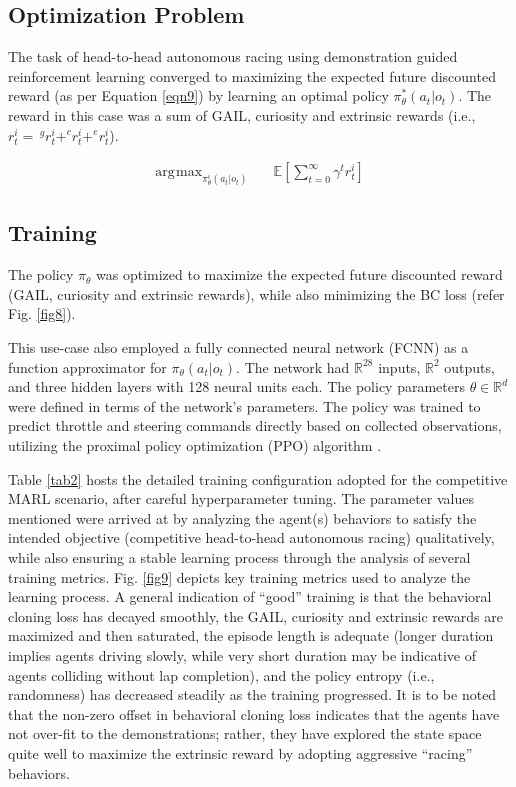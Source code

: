 \documentclass[letterpaper, 10 pt, conference]{ieeeconf}  %
\DeclareMathOperator*{\argmax}{\arg\!\max} %
\begin{document}
\subsection{Optimization Problem}
\label{Sub-Section: Optimization Problem II}

The task of head-to-head autonomous racing using demonstration guided reinforcement learning converged to maximizing the expected future discounted reward (as per Equation \ref{eqn9}) by learning an optimal policy $\pi^*_\theta \left(a_t|o_t\right)$. The reward in this case was a sum of GAIL, curiosity and extrinsic rewards (i.e., $r^i_t =\, ^{g}r^i_t + ^{c}r^i_t + ^{e}r^i_t$).

\begin{align}
\label{eqn9}
\argmax_{\pi^i_\theta \left(a_t|o_t\right)} \quad &\mathbb{E}\left [ \sum_{t=0}^{\infty} \gamma^t r^i_t \right ]
\end{align}

\subsection{Training}
\label{Sub-Section: Training II}

The policy $\pi_\theta$ was optimized to maximize the expected future discounted reward (GAIL, curiosity and extrinsic rewards), while also minimizing the BC loss (refer Fig. \ref{fig8}).

This use-case also employed a fully connected neural network (FCNN) as a function approximator for $\pi_\theta \left ( a_t | o_t \right )$. The network had $\mathbb{R}^{28}$ inputs, $\mathbb{R}^{2}$ outputs, and three hidden layers with 128 neural units each. The policy parameters $\theta \in \mathbb{R}^d$ were defined in terms of the network's parameters. The policy was trained to predict throttle and steering commands directly based on collected observations, utilizing the proximal policy optimization (PPO) algorithm \cite{PPO2017}.

Table \ref{tab2} hosts the detailed training configuration adopted for the competitive MARL scenario, after careful hyperparameter tuning. The parameter values mentioned were arrived at by analyzing the agent(s) behaviors to satisfy the intended objective (competitive head-to-head autonomous racing) qualitatively, while also ensuring a stable learning process through the analysis of several training metrics. Fig. \ref{fig9} depicts key training metrics used to analyze the learning process. A general indication of ``good'' training is that the behavioral cloning loss has decayed smoothly, the GAIL, curiosity and extrinsic rewards are maximized and then saturated, the episode length is adequate (longer duration implies agents driving slowly, while very short duration may be indicative of agents colliding without lap completion), and the policy entropy (i.e., randomness) has decreased steadily as the training progressed. It is to be noted that the non-zero offset in behavioral cloning loss indicates that the agents have not over-fit to the demonstrations; rather, they have explored the state space quite well to maximize the extrinsic reward by adopting aggressive ``racing'' behaviors.
\end{document}
